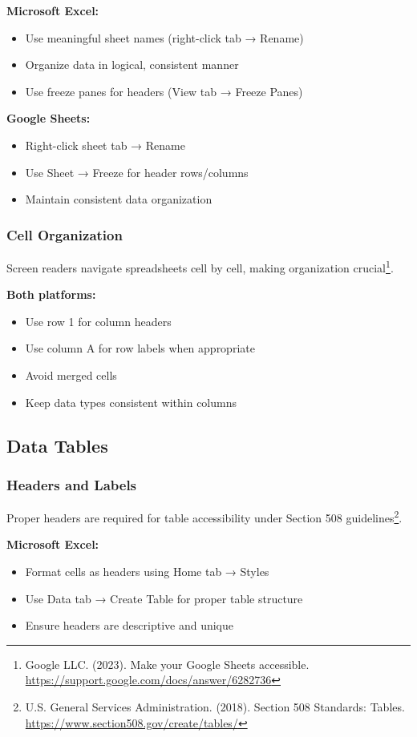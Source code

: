 \textbf{Microsoft Excel:}
\begin{itemize}
\item Use meaningful sheet names (right-click tab → Rename)
\item Organize data in logical, consistent manner
\item Use freeze panes for headers (View tab → Freeze Panes)
\end{itemize}

\textbf{Google Sheets:}
\begin{itemize}
\item Right-click sheet tab → Rename
\item Use Sheet → Freeze for header rows/columns
\item Maintain consistent data organization
\end{itemize}

\subsubsection{Cell Organization}
Screen readers navigate spreadsheets cell by cell, making organization crucial\footnote{Google LLC. (2023). Make your Google Sheets accessible. \url{https://support.google.com/docs/answer/6282736}}.

\textbf{Both platforms:}
\begin{itemize}
\item Use row 1 for column headers
\item Use column A for row labels when appropriate
\item Avoid merged cells
\item Keep data types consistent within columns
\end{itemize}

\subsection{Data Tables}

\subsubsection{Headers and Labels}
Proper headers are required for table accessibility under Section 508 guidelines\footnote{U.S. General Services Administration. (2018). Section 508 Standards: Tables. \url{https://www.section508.gov/create/tables/}}.

\textbf{Microsoft Excel:}
\begin{itemize}
\item Format cells as headers using Home tab → Styles
\item Use Data tab → Create Table for proper table structure
\item Ensure headers are descriptive and unique
\end{itemize}

